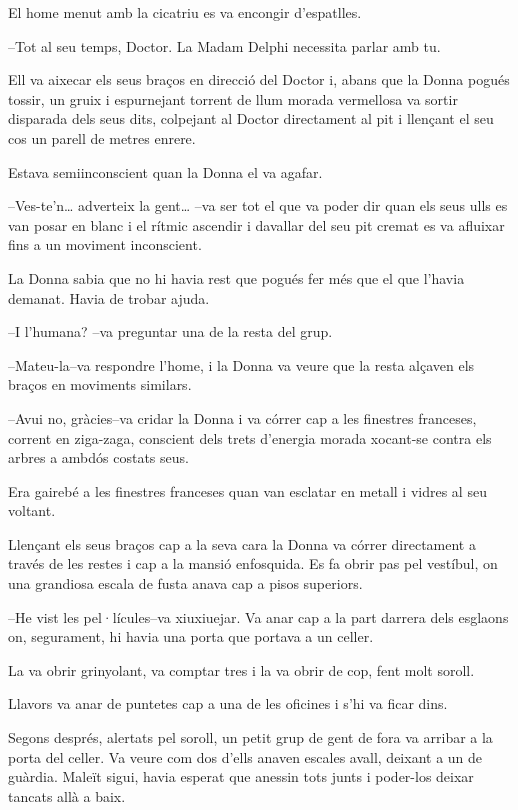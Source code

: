 El home menut amb la cicatriu es va encongir d'espatlles.

--Tot al seu temps, Doctor. La Madam Delphi necessita parlar amb tu.

Ell va aixecar els seus braços en direcció del Doctor i, abans que la
Donna pogués tossir, un gruix i espurnejant torrent de llum morada
vermellosa va sortir disparada dels seus dits, colpejant al Doctor
directament al pit i llençant el seu cos un parell de metres enrere.

Estava semiinconscient quan la Donna el va agafar.

--Ves-te'n\ldots{} adverteix la gent\ldots{} --va ser tot el que va
poder dir quan els seus ulls es van posar en blanc i el rítmic ascendir
i davallar del seu pit cremat es va afluixar fins a un moviment
inconscient.

La Donna sabia que no hi havia rest que pogués fer més que el que
l'havia demanat. Havia de trobar ajuda.

--I l'humana? --va preguntar una de la resta del grup.

--Mateu-la--va respondre l'home, i la Donna va veure que la resta
alçaven els braços en moviments similars.

--Avui no, gràcies--va cridar la Donna i va córrer cap a les finestres
franceses, corrent en ziga-zaga, conscient dels trets d'energia morada
xocant-se contra els arbres a ambdós costats seus.

Era gairebé a les finestres franceses quan van esclatar en metall i
vidres al seu voltant.

Llençant els seus braços cap a la seva cara la Donna va córrer
directament a través de les restes i cap a la mansió enfosquida. Es fa
obrir pas pel vestíbul, on una grandiosa escala de fusta anava cap a
pisos superiors.

--He vist les pel·lícules--va xiuxiuejar. Va anar cap a la part darrera
dels esglaons on, segurament, hi havia una porta que portava a un
celler.

La va obrir grinyolant, va comptar tres i la va obrir de cop, fent molt
soroll.

Llavors va anar de puntetes cap a una de les oficines i s'hi va ficar
dins.

Segons després, alertats pel soroll, un petit grup de gent de fora va
arribar a la porta del celler. Va veure com dos d'ells anaven escales
avall, deixant a un de guàrdia. Maleït sigui, havia esperat que anessin
tots junts i poder-los deixar tancats allà a baix.

